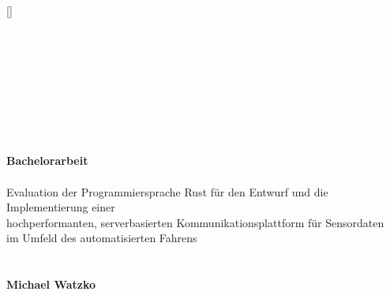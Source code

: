 

\newcommand{\setitle}{Bachelorarbeit}
\newcommand{\seauthor}{Michael Watzko}
\newcommand{\figurewidth}{0.66\textwidth}

\clearscrheadings
\clearscrplain

\pagestyle{scrheadings}	

\ihead[]{\leftmark}
\ohead[]{\rightmark}

\ifoot[]{}
\ofoot[\pagemark]{\pagemark}
\setheadsepline{.4pt}[\color{black}]


\begin{titlepage}
	\centering
	~\\ ~\\ 
	\vspace*{2em}
	~\\ %
	~\\ %
	 ~\\ ~\\ ~\\ ~\\
\LARGE{
		\textbf{\setitle} ~\\ ~\\
		Evaluation der Programmiersprache Rust für den
		Entwurf und die Implementierung einer\\hochperformanten,
		serverbasierten Kommunikationsplattform für Sensordaten\\
		im Umfeld des automatisierten Fahrens
	~\\ ~\\ ~\\
	\normalsize \textbf{Michael Watzko} \\
}
\end{titlepage}





